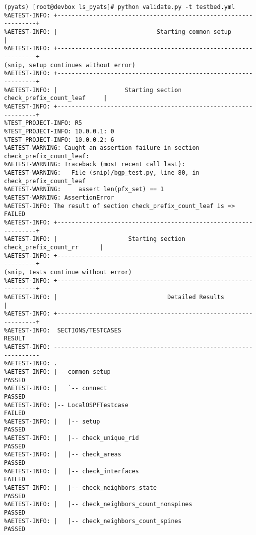 \begin{verbatim}
(pyats) [root@devbox ls_pyats]# python validate.py -t testbed.yml
%AETEST-INFO: +----------------------------------------------------------------+
%AETEST-INFO: |                            Starting common setup               |
%AETEST-INFO: +----------------------------------------------------------------+
(snip, setup continues without error)
%AETEST-INFO: +----------------------------------------------------------------+
%AETEST-INFO: |                   Starting section check_prefix_count_leaf     |
%AETEST-INFO: +----------------------------------------------------------------+
%TEST_PROJECT-INFO: R5
%TEST_PROJECT-INFO: 10.0.0.1: 0
%TEST_PROJECT-INFO: 10.0.0.2: 6
%AETEST-WARNING: Caught an assertion failure in section check_prefix_count_leaf:
%AETEST-WARNING: Traceback (most recent call last):
%AETEST-WARNING:   File (snip)/bgp_test.py, line 80, in check_prefix_count_leaf
%AETEST-WARNING:     assert len(pfx_set) == 1
%AETEST-WARNING: AssertionError
%AETEST-INFO: The result of section check_prefix_count_leaf is => FAILED
%AETEST-INFO: +----------------------------------------------------------------+
%AETEST-INFO: |                    Starting section check_prefix_count_rr      |
%AETEST-INFO: +----------------------------------------------------------------+
(snip, tests continue without error)
%AETEST-INFO: +----------------------------------------------------------------+
%AETEST-INFO: |                               Detailed Results                 |
%AETEST-INFO: +----------------------------------------------------------------+
%AETEST-INFO:  SECTIONS/TESTCASES                                        RESULT
%AETEST-INFO: ------------------------------------------------------------------
%AETEST-INFO: .
%AETEST-INFO: |-- common_setup                                            PASSED
%AETEST-INFO: |   `-- connect                                             PASSED
%AETEST-INFO: |-- LocalOSPFTestcase                                       FAILED
%AETEST-INFO: |   |-- setup                                               PASSED
%AETEST-INFO: |   |-- check_unique_rid                                    PASSED
%AETEST-INFO: |   |-- check_areas                                         PASSED
%AETEST-INFO: |   |-- check_interfaces                                    FAILED
%AETEST-INFO: |   |-- check_neighbors_state                               PASSED
%AETEST-INFO: |   |-- check_neighbors_count_nonspines                     PASSED
%AETEST-INFO: |   |-- check_neighbors_count_spines                        PASSED

\end{verbatim}
